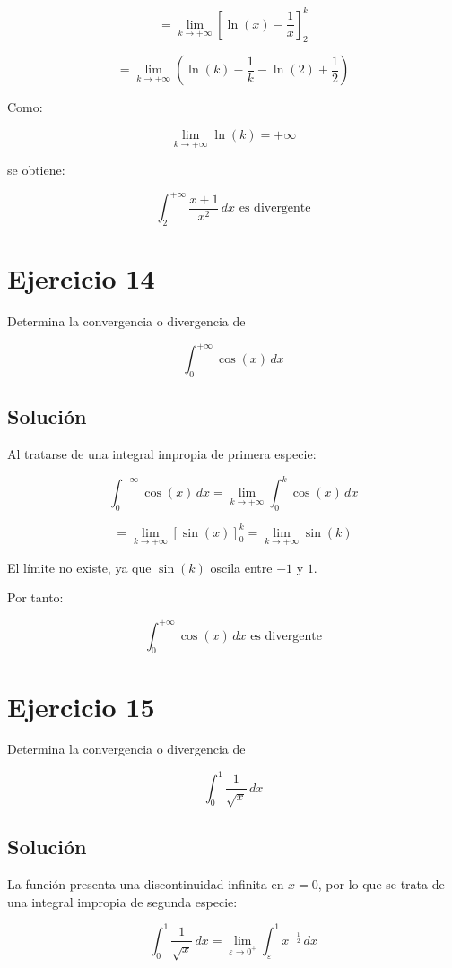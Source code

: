 \documentclass[fleqn]{article}
\begin{document}
	\[
	=
	\lim_{k\to+\infty}
	\left[
	\ln(x)-\frac{1}{x}
	\right]_2^k
	\]

	\[
	=
	\lim_{k\to+\infty}
	\left(
	\ln(k)-\frac{1}{k}
	-\ln(2)+\frac{1}{2}
	\right)
	\]

	Como:

	\[
	\lim_{k\to+\infty}\ln(k)=+\infty
	\]

	se obtiene:

	\[
	\boxed{
	\int_2^{+\infty}\frac{x+1}{x^2}\,dx
	\text{ es divergente}
	}
	\]

\section{Ejercicio 14}
	Determina la convergencia o divergencia de

	\[
	\int_0^{+\infty}\cos(x)\,dx
	\]

	\subsection{Solución}

	Al tratarse de una integral impropia de primera especie:

	\[
	\int_0^{+\infty}\cos(x)\,dx
	=
	\lim_{k\to+\infty}
	\int_0^k\cos(x)\,dx
	\]

	\[
	=
	\lim_{k\to+\infty}
	\left[
	\sin(x)
	\right]_0^k
	=
	\lim_{k\to+\infty}\sin(k)
	\]

	El límite no existe, ya que $\sin(k)$ oscila entre $-1$ y $1$.

	Por tanto:

	\[
	\boxed{
	\int_0^{+\infty}\cos(x)\,dx
	\text{ es divergente}
	}
	\]

\section{Ejercicio 15}
	Determina la convergencia o divergencia de

	\[
	\int_0^1\frac{1}{\sqrt{x}}\,dx
	\]

	\subsection{Solución}

	La función presenta una discontinuidad infinita en $x=0$, por lo que se trata de una integral impropia de segunda especie:

	\[
	\int_0^1\frac{1}{\sqrt{x}}\,dx
	=
	\lim_{\varepsilon\to0^+}
	\int_{\varepsilon}^1 x^{-\frac{1}{2}}\,dx
	\]
\end{document}
